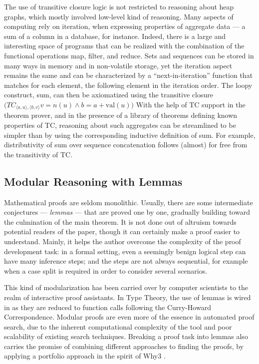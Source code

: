 The use of transitive closure logic is not restricted to reasoning about heap
graphs, which mostly involved low-level kind of reasoning.
Many aspects of computing rely on iteration, \eg when expressing properties of
aggregate data --- a sum of a column in a database, for instance.
Indeed, there is a large and interesting space of programs that can be realized
with the combination of the functional operations \textsf{map}, \textsf{filter},
and \textsf{reduce}. %
Sets and sequences can be stored in many ways in memory and in non-volatile
storage, yet the iteration aspect remains the same and can be characterized by
a ``next-in-iteration'' function that matches for each element, the following
element in the iteration order.
The loopy construct, \eg sum, can then be axiomatized using the transitive
closure $\big(TC_{\langle a,u\rangle,\langle b,v\rangle}v=n(u) \land b=a+\mathrm{val}(u)\big)$
With the help of TC support in the theorem prover, and in the presence of a
library of theorems defining known properties of TC, reasoning about such
aggregates can be streamlined to be simpler than by using the corresponding
inductive definition of sum.
For example, distributivity of sum over sequence concatenation follows (almost)
for free from the transitivity of TC.



\subsection{Modular Reasoning with Lemmas}

Mathematical proofs are seldom monolithic.
Usually, there are some intermediate conjectures --- \emph{lemmas} --- that
are proved one by one, gradually building toward the culmination of the main
theorem.
It is not done out of altruism towards potential readers of the paper, though it can
certainly make a proof easier to understand.
Mainly, it helps the author overcome the complexity of the proof development
task: in a formal setting, even a seemingly benign logical step can have many
inference steps; and the steps are not always sequential, for example when
a case split is required in order to consider several scenarios.

This kind of modularization has been carried over by computer scientists to the
realm of interactive proof assistants.
In Type Theory, the use of lemmas is wired in as they are reduced to function
calls following the Curry-Howard Correspondence.
Modular proofs are even more of the essence in automated proof search, due to
the inherent computational complexity of the tool and poor scalability of
existing search techniques.
Breaking a proof task into lemmas also carries the promise of combining different
approaches to finding the proofs, by applying a portfolio approach in the spirit
of Why3 \cite{}.

